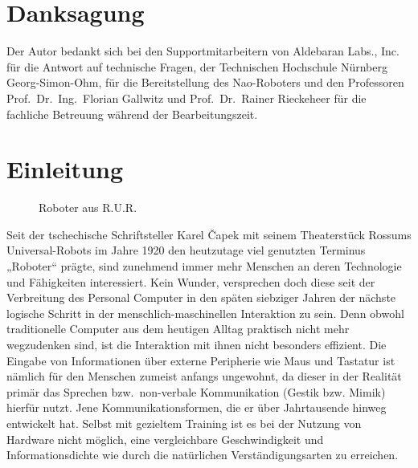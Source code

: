 \documentclass[fontsize=11pt,paper=a4,twoside,openright]{scrreprt}
\newcounter{alteSeitenzahl}
\begin{document}
\chapter*{Danksagung}
Der Autor bedankt sich bei den Supportmitarbeitern von Aldebaran Labs., Inc. für die Antwort auf technische Fragen, der Technischen Hochschule Nürnberg Georg-Simon-Ohm, für die Bereitstellung des Nao-Roboters und den Professoren Prof.\ Dr.\ Ing.\ Florian Gallwitz und Prof.\ Dr.\ Rainer Rieckeheer für die fachliche Betreuung während der Bearbeitungszeit.
\clearpage

\newpage
\section*{}

\singlespacing
\tableofcontents

\chapter{Einleitung}
\label{sec:Einleitung}
\setcounter{alteSeitenzahl}{\value{page}}
\begin{wrapfigure}{r}{0.30\textwidth}
\vspace{-12pt}
  \centering
  \caption[Roboter aus R.U.R.]{Roboter aus R.U.R.\protect \footnotemark}
\vspace{-10pt}
  \label{fig:Roboter aus R.U.R.}
\end{wrapfigure}
Seit der tschechische Schriftsteller Karel Čapek mit seinem Theaterstück Rossums Universal-Robots im Jahre 1920 den heutzutage viel genutzten Terminus „Roboter“ prägte, sind zunehmend immer mehr Menschen an deren Technologie und Fähigkeiten interessiert.
Kein Wunder, versprechen doch diese seit der Verbreitung des Personal Computer in den späten siebziger Jahren der nächste logische Schritt in der menschlich-maschinellen Interaktion zu sein.
Denn obwohl traditionelle Computer aus dem heutigen Alltag praktisch nicht mehr wegzudenken sind, ist die Interaktion mit ihnen nicht besonders effizient.
Die Eingabe von Informationen über externe Peripherie wie Maus und Tastatur ist nämlich für den Menschen zumeist anfangs ungewohnt, da dieser in der Realität primär das Sprechen bzw.\ non-verbale Kommunikation (Gestik bzw. Mimik) hierfür nutzt.
Jene Kommunikationsformen, die er über Jahrtausende hinweg entwickelt hat.
Selbst mit gezieltem Training ist es bei der Nutzung von Hardware nicht möglich, eine vergleichbare Geschwindigkeit und Informationsdichte wie durch die natürlichen Verständigungsarten zu erreichen.
\end{document}
